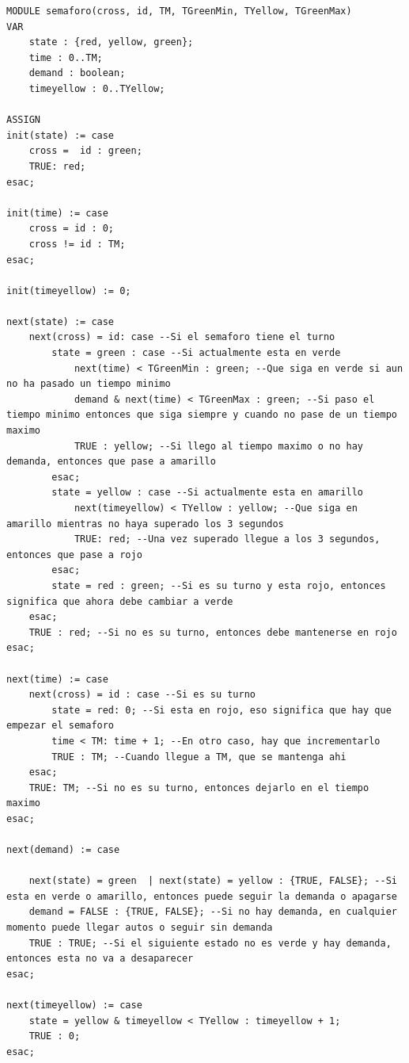 \begin{lstlisting}[language=NuSMV, caption={Modelo con demanda y extensión inteligente}]
MODULE semaforo(cross, id, TM, TGreenMin, TYellow, TGreenMax)
VAR
    state : {red, yellow, green};
    time : 0..TM;
    demand : boolean;
    timeyellow : 0..TYellow;

ASSIGN
init(state) := case
    cross =  id : green;
    TRUE: red;
esac;

init(time) := case
    cross = id : 0;
    cross != id : TM;
esac;

init(timeyellow) := 0;

next(state) := case
    next(cross) = id: case --Si el semaforo tiene el turno
        state = green : case --Si actualmente esta en verde
            next(time) < TGreenMin : green; --Que siga en verde si aun no ha pasado un tiempo minimo
            demand & next(time) < TGreenMax : green; --Si paso el tiempo minimo entonces que siga siempre y cuando no pase de un tiempo maximo 
            TRUE : yellow; --Si llego al tiempo maximo o no hay demanda, entonces que pase a amarillo
        esac;
        state = yellow : case --Si actualmente esta en amarillo
            next(timeyellow) < TYellow : yellow; --Que siga en amarillo mientras no haya superado los 3 segundos
            TRUE: red; --Una vez superado llegue a los 3 segundos, entonces que pase a rojo
        esac;
        state = red : green; --Si es su turno y esta rojo, entonces significa que ahora debe cambiar a verde
    esac;
    TRUE : red; --Si no es su turno, entonces debe mantenerse en rojo
esac;

next(time) := case
    next(cross) = id : case --Si es su turno
        state = red: 0; --Si esta en rojo, eso significa que hay que empezar el semaforo
        time < TM: time + 1; --En otro caso, hay que incrementarlo
        TRUE : TM; --Cuando llegue a TM, que se mantenga ahi
    esac;
    TRUE: TM; --Si no es su turno, entonces dejarlo en el tiempo maximo
esac;

next(demand) := case 

    next(state) = green  | next(state) = yellow : {TRUE, FALSE}; --Si esta en verde o amarillo, entonces puede seguir la demanda o apagarse
    demand = FALSE : {TRUE, FALSE}; --Si no hay demanda, en cualquier momento puede llegar autos o seguir sin demanda
    TRUE : TRUE; --Si el siguiente estado no es verde y hay demanda, entonces esta no va a desaparecer
esac;

next(timeyellow) := case
    state = yellow & timeyellow < TYellow : timeyellow + 1;
    TRUE : 0;
esac;


\end{lstlisting}
